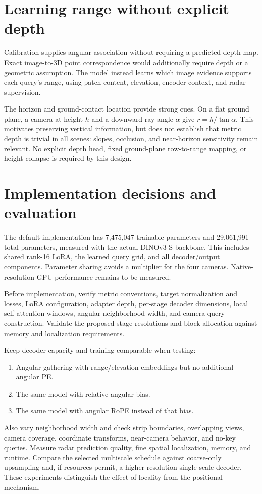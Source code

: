 \documentclass[11pt,a4paper]{article}
\begin{document}
\section{Learning range without explicit depth}
Calibration supplies angular association without requiring a predicted depth map. Exact image-to-3D point correspondence would additionally require depth or a geometric assumption. The model instead learns which image evidence supports each query's range, using patch content, elevation, encoder context, and radar supervision.

The horizon and ground-contact location provide strong cues. On a flat ground plane, a camera at height $h$ and a downward ray angle $\alpha$ give $r=h/\tan\alpha$. This motivates preserving vertical information, but does not establish that metric depth is trivial in all scenes: slopes, occlusion, and near-horizon sensitivity remain relevant. No explicit depth head, fixed ground-plane row-to-range mapping, or height collapse is required by this design.

\section{Implementation decisions and evaluation}
The default implementation has 7,475,047 trainable parameters and 29,061,991 total parameters, measured with the actual DINOv3-S backbone. This includes shared rank-16 LoRA, the learned query grid, and all decoder/output components. Parameter sharing avoids a multiplier for the four cameras. Native-resolution GPU performance remains to be measured.

Before implementation, verify metric conventions, target normalization and losses, LoRA configuration, adapter depth, per-stage decoder dimensions, local self-attention windows, angular neighborhood width, and camera-query construction. Validate the proposed stage resolutions and block allocation against memory and localization requirements.

Keep decoder capacity and training comparable when testing:
\begin{enumerate}
 \item Angular gathering with range/elevation embeddings but no additional angular PE.
 \item The same model with relative angular bias.
 \item The same model with angular RoPE instead of that bias.
\end{enumerate}
Also vary neighborhood width and check strip boundaries, overlapping views, camera coverage, coordinate transforms, near-camera behavior, and no-key queries. Measure radar prediction quality, fine spatial localization, memory, and runtime. Compare the selected multiscale schedule against coarse-only upsampling and, if resources permit, a higher-resolution single-scale decoder. These experiments distinguish the effect of locality from the positional mechanism.
\end{document}
